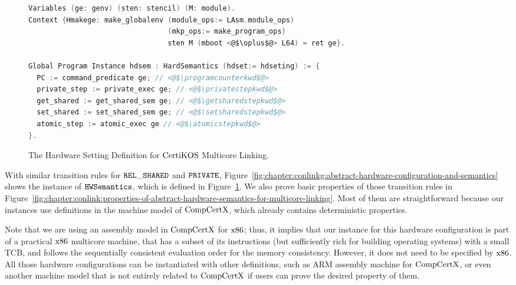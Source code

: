 \begin{figure}
\begin{lstlisting}[language=C]
Variables (ge: genv) (sten: stencil) (M: module).
Context {Hmakege: make_globalenv (module_ops:= LAsm.module_ops) 
                                 (mkp_ops:= make_program_ops) 
                                 sten M (mboot <@$\oplus$@> L64) = ret ge}.

Global Program Instance hdsem : HardSemantics (hdset:= hdseting) := {
  PC := command_predicate ge; // <@$\programcounterkwd$@>
  private_step := private_exec ge; // <@$\privatestepkwd$@>
  get_shared := get_shared_sem ge; // <@$\getsharedstepkwd$@>
  set_shared := set_shared_sem ge; // <@$\setsharedstepkwd$@>
  atomic_step := atomic_exec ge // <@$\atomicstepkwd$@>
}.
\end{lstlisting}
\caption{The Hardware Setting Definition for $\mathrm{CertiKOS}$ Multicore Linking.}
\label{fig:chapter:certikos:hardware-local-step-transition-rules}
\end{figure}

With similar transition rules for ${{\mathrm{\texttt{REL}}}\_{\mathrm{\texttt{SHARED}}}}$ and ${{\mathrm{\texttt{PRIVATE}}}}$,
Figure~\ref{fig:chapter:conlinkg:abstract-hardware-configuration-and-semantics}
shows the instance of ${\mathrm{\texttt{HWSemantics}}}$, which is defined in Figure~\ref{fig:chapter:certikos:hardware-local-step-transition-rules}. 
We also prove basic properties of those transition rules in Figure~\ref{fig:chapter:conlink:properties-of-abstract-hardware-semantics-for-multicore-linking}.
Most of them are straightforward because our instances use  definitions in the machine model of $\mathrm{CompCertX}$,
which already contains  deterministic properties. 

Note that we are using an assembly model  in $\mathrm{CompCertX}$ for $\mathrm{x86}$; thus, it implies that 
our instance for this hardware configuration is   part of a practical $\mathrm{x86}$ multicore machine,
that has a subset of its instructions (but sufficiently rich for building operating systems) with a small TCB, 
and follows the sequentially consistent evaluation order for the memory consistency. 
However, it does not need to be specified by $\mathrm{x86}$. 
All those hardware configurations can be instantiated with other definitions, such as ARM assembly machine for $\mathrm{CompCertX}$, 
or even another machine model that is not entirely related to $\mathrm{CompCertX}$ if users can prove the desired property of them.



